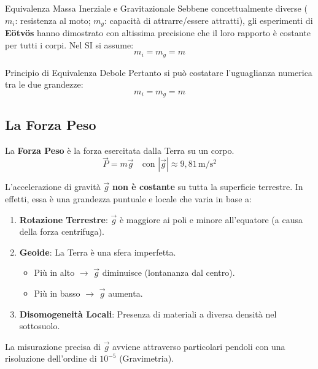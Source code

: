 \begin{teorema}{Equivalenza Massa Inerziale e Gravitazionale}
Sebbene concettualmente diverse (\textbf{$m_i$}: resistenza al moto; \textbf{$m_g$}: capacità di attrarre/essere attratti), gli esperimenti di \textbf{Eötvös} hanno dimostrato con altissima precisione che il loro rapporto è costante per tutti i corpi. Nel SI si assume:
\begin{equation}
    m_i = m_g = m
\end{equation}
\end{teorema}

\begin{osservazione}{Principio di Equivalenza Debole}
Pertanto si può costatare l'uguaglianza numerica tra le due grandezze:
\begin{equation}
    m_i = m_g = m
\end{equation}
\end{osservazione}

\subsection{La Forza Peso}
La \textbf{Forza Peso} è la forza esercitata dalla Terra su un corpo.
\begin{equation}
    \vec{P} = m \vec{g} \quad \text{con } |\vec{g}| \approx 9{,}81 \, \mathrm{m/s^2}
\end{equation}

L'accelerazione di gravità $\vec{g}$ \textbf{non è costante} su tutta la superficie terrestre. In effetti, essa è una grandezza puntuale e locale che varia in base a:
\begin{enumerate}
    \item \textbf{Rotazione Terrestre}: $\vec{g}$ è maggiore ai poli e minore all'equatore (a causa della forza centrifuga).
    \item \textbf{Geoide}: La Terra è una sfera imperfetta.
    \begin{itemize}
        \item Più in alto $\rightarrow$ $\vec{g}$ diminuisce (lontananza dal centro).
        \item Più in basso $\rightarrow$ $\vec{g}$ aumenta.
    \end{itemize}
    \item \textbf{Disomogeneità Locali}: Presenza di materiali a diversa densità nel sottosuolo.
\end{enumerate}

La misurazione precisa di $\vec{g}$ avviene attraverso particolari pendoli con una risoluzione dell'ordine di $10^{-5}$ (Gravimetria).

